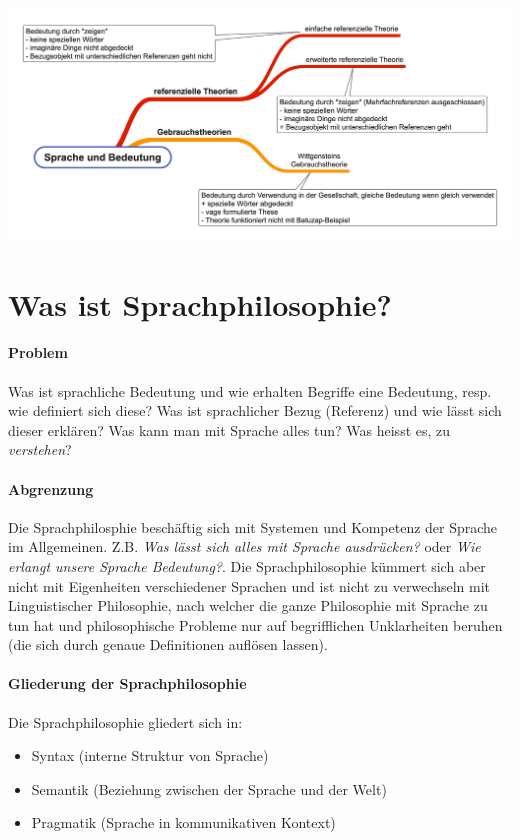 \documentclass[../main.tex]{subfiles}
\begin{document}
\includegraphics[width=\textwidth]{images/Sprache_und_Bedeutung_Uebersicht.png}

\section{Was ist Sprachphilosophie?}
\paragraph{Problem} Was ist sprachliche Bedeutung und wie erhalten Begriffe eine Bedeutung, resp. wie definiert sich diese? Was ist sprachlicher Bezug (Referenz) und wie lässt sich dieser erklären? Was kann man mit Sprache alles tun? Was heisst es, zu \emph{verstehen}?

\paragraph{Abgrenzung} Die Sprachphilosphie beschäftig sich mit Systemen und Kompetenz der Sprache im Allgemeinen. Z.B. \textit{Was lässt sich alles mit Sprache ausdrücken?} oder \textit{Wie erlangt unsere Sprache Bedeutung?}. Die Sprachphilosophie kümmert sich aber nicht mit Eigenheiten verschiedener Sprachen und ist nicht zu verwechseln mit Linguistischer Philosophie, nach welcher die ganze Philosophie mit Sprache zu tun hat und philosophische Probleme nur auf begrifflichen Unklarheiten beruhen (die sich durch genaue Definitionen auflösen lassen).

\paragraph{Gliederung der Sprachphilosophie} Die Sprachphilosophie gliedert sich in:
\begin{itemize}
  \item Syntax (interne Struktur von Sprache)
  \item Semantik (Beziehung zwischen der Sprache und der Welt)
  \item Pragmatik (Sprache in kommunikativen Kontext)
\end{itemize}
\end{document}
